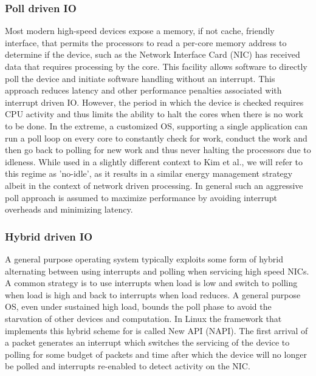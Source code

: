 \subsubsection{Poll driven IO}
\label{sec:workflow:pollio}
Most modern high-speed devices expose a memory, if not cache, friendly interface, that permits the processors to read a per-core memory address to determine if the device, such as the Network Interface Card (NIC) has received data that requires processing by the core.  This facility allows software to directly poll the device and initiate software handling without an interrupt.  This approach reduces latency and other performance penalties associated with interrupt driven IO.  However, the period in which the device is checked requires CPU activity and thus limits the ability to halt the cores when there is no work to be done.  In the extreme, a customized OS, supporting a single application can run a poll loop on every core to constantly check for work, conduct the work and then go back to polling for new work and thus never halting the processors due to idleness. While used in a slightly different context to Kim et al.\cite{pacingtoidle}, we will refer to this regime as 'no-idle', as it results in a similar energy management strategy albeit in the context of network driven processing.  In general such an aggressive poll approach is assumed to maximize performance by avoiding interrupt overheads and minimizing latency. 

\subsubsection{Hybrid driven IO}
A general purpose operating system typically exploits some form of hybrid alternating between using interrupts and polling when servicing high speed NICs. A common strategy is to use interrupts when load is low and switch to polling when load is high and back to interrupts when load reduces.  A general purpose OS, even under sustained high load, bounds the poll phase to avoid the starvation of other devices and computation.  In Linux the framework that implements this hybrid scheme for is called New API (NAPI)\cite{NAPI}.  The first arrival of a packet generates an interrupt which switches the servicing of the device to polling for some budget of packets and time after which the device will no longer be polled and interrupts re-enabled to detect activity on the NIC.  

